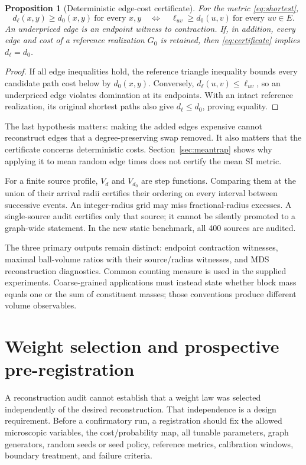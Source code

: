 \documentclass[11pt,letterpaper]{article}
\newtheorem{proposition}[theorem]{Proposition}
\theoremstyle{definition}
\theoremstyle{remark}
\begin{document}
\begin{proposition}[Deterministic edge-cost certificate]\label{prop:domination}
For the metric \eqref{eq:shortest},
\begin{equation}
 d_\ell(x,y)\geq d_0(x,y)\ \text{for every }x,y
 \quad\Longleftrightarrow\quad
 \ell_{uv}\geq d_0(u,v)\ \text{for every }uv\in E.
 \label{eq:certificate}
\end{equation}
An underpriced edge is an endpoint witness to contraction. If, in addition, every edge and cost of a reference realization $G_0$ is retained, then \eqref{eq:certificate} implies $d_\ell=d_0$.
\end{proposition}
\begin{proof}
If all edge inequalities hold, the reference triangle inequality bounds every candidate path cost below by $d_0(x,y)$. Conversely, $d_\ell(u,v)\leq\ell_{uv}$, so an underpriced edge violates domination at its endpoints. With an intact reference realization, its original shortest paths also give $d_\ell\leq d_0$, proving equality.
\end{proof}

The last hypothesis matters: making the added edges expensive cannot reconstruct edges that a degree-preserving swap removed. It also matters that the certificate concerns deterministic costs. Section~\ref{sec:meantrap} shows why applying it to mean random edge times does not certify the mean SI metric.

For a finite source profile, $V_d$ and $V_{d_0}$ are step functions. Comparing them at the union of their arrival radii certifies their ordering on every interval between successive events. An integer-radius grid may miss fractional-radius excesses. A single-source audit certifies only that source; it cannot be silently promoted to a graph-wide statement. In the new static benchmark, all 400 sources are audited.

The three primary outputs remain distinct: endpoint contraction witnesses, maximal ball-volume ratios with their source/radius witnesses, and MDS reconstruction diagnostics. Common counting measure is used in the supplied experiments. Coarse-grained applications must instead state whether block mass equals one or the sum of constituent masses; those conventions produce different volume observables.

\section{Weight selection and prospective pre-registration}\label{sec:prereg}
A reconstruction audit cannot establish that a weight law was selected independently of the desired reconstruction. That independence is a design requirement. Before a confirmatory run, a registration should fix the allowed microscopic variables, the cost/probability map, all tunable parameters, graph generators, random seeds or seed policy, reference metrics, calibration windows, boundary treatment, and failure criteria.
\end{document}
